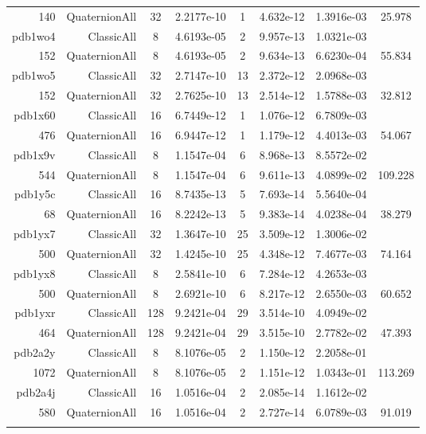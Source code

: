 \begin{xltabular}{\textwidth}{r|rcS[table-format=1.4e+2]cS[table-format=1.3e+2]S[table-format=1.4e+2]S[table-format=-1.3]}
140 & QuaternionAll & 32 & 2.2177e-10 & 1 & 4.632e-12 & 1.3916e-03 & 25.978\\  \addlinespace
pdb1wo4 & ClassicAll & 8 & 4.6193e-05 & 2 & 9.957e-13 & 1.0321e-03 & \\
152 & QuaternionAll & 8 & 4.6193e-05 & 2 & 9.634e-13 & 6.6230e-04 & 55.834\\  \addlinespace
pdb1wo5 & ClassicAll & 32 & 2.7147e-10 & 13 & 2.372e-12 & 2.0968e-03 & \\
152 & QuaternionAll & 32 & 2.7625e-10 & 13 & 2.514e-12 & 1.5788e-03 & 32.812\\  \addlinespace
pdb1x60 & ClassicAll & 16 & 6.7449e-12 & 1 & 1.076e-12 & 6.7809e-03 & \\
476 & QuaternionAll & 16 & 6.9447e-12 & 1 & 1.179e-12 & 4.4013e-03 & 54.067\\  \addlinespace
pdb1x9v & ClassicAll & 8 & 1.1547e-04 & 6 & 8.968e-13 & 8.5572e-02 & \\
544 & QuaternionAll & 8 & 1.1547e-04 & 6 & 9.611e-13 & 4.0899e-02 & 109.228\\  \addlinespace
pdb1y5c & ClassicAll & 16 & 8.7435e-13 & 5 & 7.693e-14 & 5.5640e-04 & \\
68 & QuaternionAll & 16 & 8.2242e-13 & 5 & 9.383e-14 & 4.0238e-04 & 38.279\\  \addlinespace
pdb1yx7 & ClassicAll & 32 & 1.3647e-10 & 25 & 3.509e-12 & 1.3006e-02 & \\
500 & QuaternionAll & 32 & 1.4245e-10 & 25 & 4.348e-12 & 7.4677e-03 & 74.164\\  \addlinespace
pdb1yx8 & ClassicAll & 8 & 2.5841e-10 & 6 & 7.284e-12 & 4.2653e-03 & \\
500 & QuaternionAll & 8 & 2.6921e-10 & 6 & 8.217e-12 & 2.6550e-03 & 60.652\\  \addlinespace
pdb1yxr & ClassicAll & 128 & 9.2421e-04 & 29 & 3.514e-10 & 4.0949e-02 & \\
464 & QuaternionAll & 128 & 9.2421e-04 & 29 & 3.515e-10 & 2.7782e-02 & 47.393\\  \addlinespace
pdb2a2y & ClassicAll & 8 & 8.1076e-05 & 2 & 1.150e-12 & 2.2058e-01 & \\
1072 & QuaternionAll & 8 & 8.1076e-05 & 2 & 1.151e-12 & 1.0343e-01 & 113.269\\  \addlinespace
pdb2a4j & ClassicAll & 16 & 1.0516e-04 & 2 & 2.085e-14 & 1.1612e-02 & \\
580 & QuaternionAll & 16 & 1.0516e-04 & 2 & 2.727e-14 & 6.0789e-03 & 91.019\\  \addlinespace

\end{xltabular}
